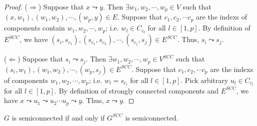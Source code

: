 \begin{proof}
    ($\Longrightarrow$)
    Suppose that $x \leadsto y$.
    Then $\exists w_1, w_2, \cdots, w_p \in V$ such that
    $(x,w_1), (w_1,w_2), \cdots, (w_p,y) \in E$.
    Suppose that $c_1, c_2, \cdots c_p$ are the indexs of components contain $w_1, w_2, \cdots, w_p$;
    i.e. $w_l \in C_{c_l}$ for all $l \in [1,p]$.
    By definition of $E^{SCC}$,
    we have $(s_i,s_{c_1}),(s_{c_1},s_{c_2}), \cdots, (s_{c_j},s_j) \in E^{SCC}$.
    Thus, $s_i \leadsto s_j$.

    ($\Longleftarrow$)
    Suppose that $s_i \leadsto s_j$.
    Then $\exists w_1, w_2, \cdots, w_p \in V^{SCC}$ such that
    $(s_i,w_1), (w_1,w_2), \cdots, (w_p,s_j) \in E^{SCC}$.
    Suppose that $c_1, c_2, \cdots c_p$ are the indexs of components $w_1, w_2, \cdots, w_p$;
    i.e. $w_l = s_{c_l}$ for all $l \in [1,p]$.
    Pick arbitrary $u_l \in C_{c_l}$ for all $l \in [1,p]$.
    By definition of strongly connected components and $E^{SCC}$,
    we have $x \leadsto u_1 \leadsto u_2 \cdots u_p \leadsto y$.
    Thus, $x \leadsto y$.
\end{proof}

\begin{lemma}
    $G$ is semiconnected if and only if
    $G^{SCC}$ is semiconnected.
\end{lemma}

